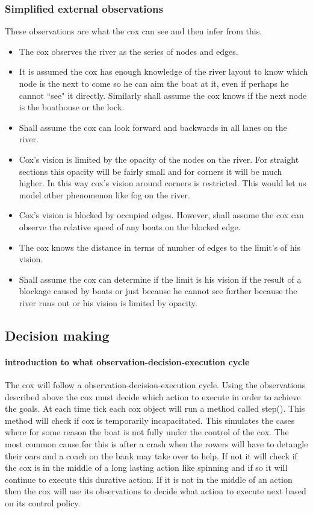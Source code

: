       \subsubsection{Simplified external observations}
      These observations are what the cox can see and then infer from this.
      \begin{itemize}
        \item The cox observes the river as the series of nodes and edges.
        \item It is assumed the cox has enough knowledge of the river layout to know which node is the next to come so he can aim the boat at it, even if perhaps he cannot ``see" it directly. Similarly shall assume the cox knows if the next node is the boathouse or the lock.
        \item Shall assume the cox can look forward and backwards in all lanes on the river.
        \item Cox's vision is limited by the opacity of the nodes on the river. For straight sections this opacity will be fairly small and for corners it will be much higher. In this way cox's vision around corners is restricted. This would let us model other phenomenon like fog on the river.
        \item Cox's vision is blocked by occupied edges. However, shall assume the cox can observe the relative speed of any boats on the blocked edge.
        \item The cox knows the distance in terms of number of edges to the limit's of his vision.
        \item Shall assume the cox can determine if the limit is his vision if the result of a blockage caused by boats or just because he cannot see further because the river runs out or his vision is limited by opacity.
      \end{itemize}
      
      \subsection{Decision making}
      \paragraph{introduction to what observation-decision-execution cycle}
      The cox will follow a observation-decision-execution cycle. Using the observations described above the cox must decide which action to execute in order to achieve the goals. At each time tick each cox object will run a method called step(). This method will check if cox is temporarily incapacitated. This simulates the cases where for some reason the boat is not fully under the control of the cox. The most common cause for this is after a crash when the rowers will have to detangle their oars and a coach on the bank may take over to help. If not it will check if the cox is in the middle of a long lasting action like spinning and if so it will continue to execute this durative action. If it is not in the middle of an action then the cox will use its observations to decide what action to execute next based on its control policy.
      
